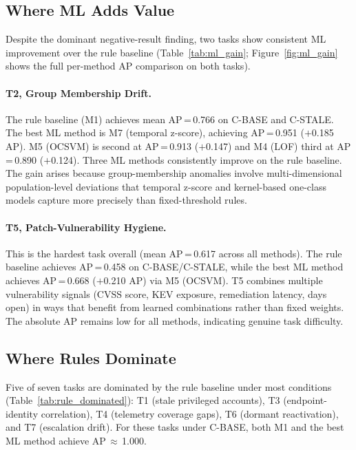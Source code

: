 \subsection{Where ML Adds Value}
\label{sec:results:ml_value}

Despite the dominant negative-result finding, two tasks show consistent ML
improvement over the rule baseline (Table~\ref{tab:ml_gain};
Figure~\ref{fig:ml_gain} shows the full per-method AP comparison on both tasks).

\paragraph{T2, Group Membership Drift.}
The rule baseline (M1) achieves mean AP\,=\,0.766 on C-BASE and C-STALE. The best
ML method is M7 (temporal z-score), achieving AP\,=\,0.951 ($+$0.185 AP). M5
(OCSVM) is second at AP\,=\,0.913 ($+$0.147) and M4 (LOF) third at AP\,=\,0.890
($+$0.124). Three ML methods consistently improve on the rule baseline. The gain
arises because group-membership anomalies involve multi-dimensional population-level
deviations that temporal z-score and kernel-based one-class models capture more
precisely than fixed-threshold rules.

\paragraph{T5, Patch-Vulnerability Hygiene.}
This is the hardest task overall (mean AP\,=\,0.617 across all methods). The rule
baseline achieves AP\,=\,0.458 on C-BASE/C-STALE, while the best ML method achieves
AP\,=\,0.668 ($+$0.210 AP) via M5 (OCSVM). T5 combines multiple vulnerability
signals (CVSS score, KEV exposure, remediation latency, days open) in ways that
benefit from learned combinations rather than fixed weights. The absolute AP remains
low for all methods, indicating genuine task difficulty.



\subsection{Where Rules Dominate}

Five of seven tasks are dominated by the rule baseline under most conditions
(Table~\ref{tab:rule_dominated}): T1 (stale privileged accounts), T3
(endpoint-identity correlation), T4 (telemetry coverage gaps), T6 (dormant
reactivation), and T7 (escalation drift). For these tasks under C-BASE, both M1
and the best ML method achieve AP\,$\approx$\,1.000.

